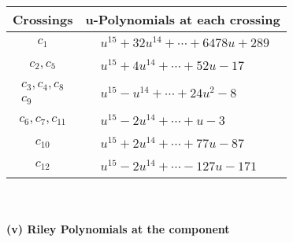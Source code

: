\documentclass[1p]{elsarticle_modified}
\theoremstyle{definition}
\begin{document}
\begin{tabular}{m{50pt}|m{274pt}}
Crossings & \hspace{64pt}u-Polynomials at each crossing \\
\hline $$\begin{aligned}c_{1}\end{aligned}$$&$\begin{aligned}
&u^{15}+32 u^{14}+\cdots+6478 u+289
\end{aligned}$\\
\hline $$\begin{aligned}c_{2},c_{5}\end{aligned}$$&$\begin{aligned}
&u^{15}+4 u^{14}+\cdots+52 u-17
\end{aligned}$\\
\hline $$\begin{aligned}c_{3},c_{4},c_{8}\\c_{9}\end{aligned}$$&$\begin{aligned}
&u^{15}- u^{14}+\cdots+24 u^2-8
\end{aligned}$\\
\hline $$\begin{aligned}c_{6},c_{7},c_{11}\end{aligned}$$&$\begin{aligned}
&u^{15}-2 u^{14}+\cdots+u-3
\end{aligned}$\\
\hline $$\begin{aligned}c_{10}\end{aligned}$$&$\begin{aligned}
&u^{15}+2 u^{14}+\cdots+77 u-87
\end{aligned}$\\
\hline $$\begin{aligned}c_{12}\end{aligned}$$&$\begin{aligned}
&u^{15}-2 u^{14}+\cdots-127 u-171
\end{aligned}$\\
\hline
\end{tabular}\\~\\
\newpage\renewcommand{\arraystretch}{1}
\flushleft \textbf{(v) Riley Polynomials at the component}\newline \\
\end{document}
